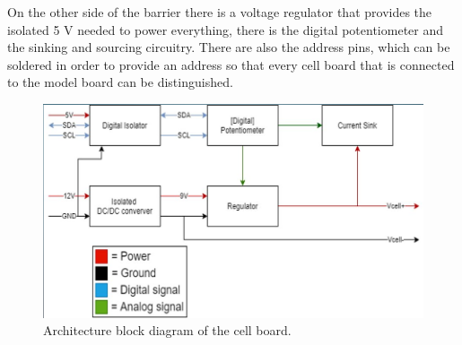     On the other side of the barrier there is a voltage regulator that provides 
    the isolated 5 V needed to power everything, there is the digital potentiometer
    and the sinking and sourcing circuitry. There are also the address pins, which
    can be soldered in order to provide an address so that every cell board that 
    is connected to the model board can be distinguished. 

    \begin{figure}[h]
        \centering
        \includegraphics[scale=0.47]{architecture_single_cell.png}
        \caption{Architecture block diagram of the cell board.}
    \end{figure}
